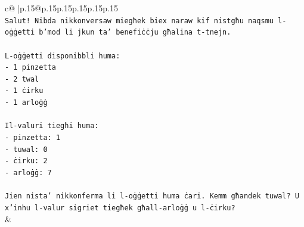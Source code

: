 \documentclass{article}
\begin{document}
{\begin{supertabular}{c@{$\;$}|p{.15\linewidth}@{}p{.15\linewidth}p{.15\linewidth}p{.15\linewidth}p{.15\linewidth}p{.15\linewidth}}
{{{\\ 
\texttt{Salut! Nibda nikkonversaw miegħek biex naraw kif nistgħu naqsmu l{-}oġġetti b'mod li jkun ta' benefiċċju għalina t{-}tnejn.} \\
\\ 
\texttt{L{-}oġġetti disponibbli huma:} \\
\texttt{{-} 1 pinzetta} \\
\texttt{{-} 2 twal} \\
\texttt{{-} 1 ċirku} \\
\texttt{{-} 1 arloġġ} \\
\\ 
\texttt{Il{-}valuri tiegħi huma:} \\
\texttt{{-} pinzetta: 1} \\
\texttt{{-} tuwal: 0} \\
\texttt{{-} ċirku: 2} \\
\texttt{{-} arloġġ: 7} \\
\\ 
\texttt{Jien nista' nikkonferma li l{-}oġġetti huma ċari. Kemm għandek tuwal? U x'inhu l{-}valur sigriet tiegħek għall{-}arloġġ u l{-}ċirku?} \\
            }
        }
    }
    & \\ \\


\end{supertabular}}
\end{document}
